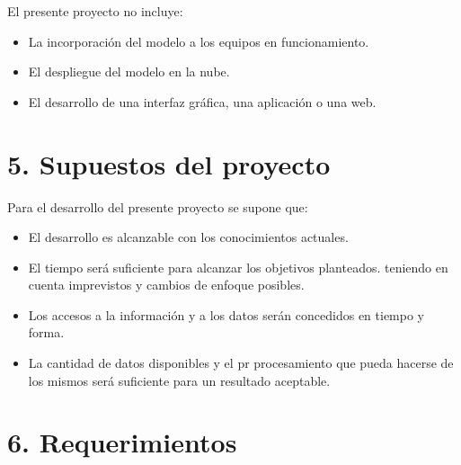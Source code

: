\documentclass[
11pt, %
]{charter}
\begin{document}
El presente proyecto no incluye: 
\begin{itemize}
	\item La incorporación del modelo a los equipos en funcionamiento.
	\item El despliegue del modelo en la nube.
	\item El desarrollo de una interfaz gráfica, una aplicación o una web.
\end{itemize}



\section{5. Supuestos del proyecto}
\label{sec:supuestos}

Para el desarrollo del presente proyecto se supone que: 

\begin{itemize}
	\item El desarrollo es alcanzable con los conocimientos actuales.
	\item El tiempo será suficiente para alcanzar los objetivos planteados. teniendo en cuenta imprevistos y cambios de enfoque posibles.
	\item Los accesos a la información y a los datos serán concedidos en tiempo y forma.
	\item La cantidad de datos disponibles y el pr procesamiento que pueda hacerse de los mismos será suficiente para un resultado aceptable.
\end{itemize}


\section{6. Requerimientos}
\label{sec:requerimientos}
\end{document}
